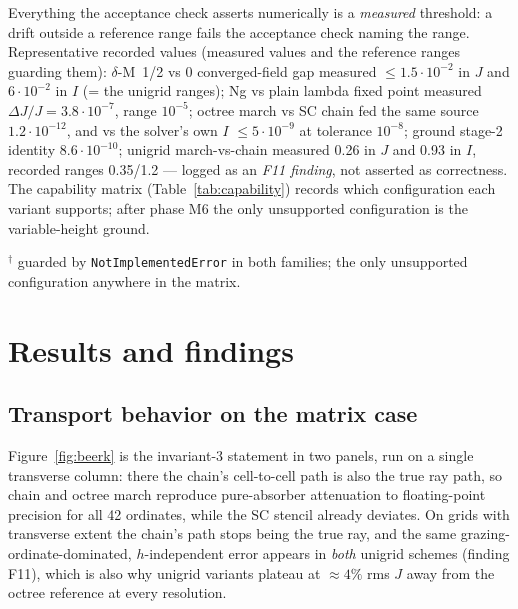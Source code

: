\documentclass[11pt,a4paper]{article}
\begin{document}
Everything the acceptance check asserts numerically is a \emph{measured} threshold: a
drift outside a reference range fails the acceptance check naming the range. Representative
recorded values (measured values and the reference ranges guarding them):
$\delta$-M~1/2 vs 0 converged-field gap measured
$\le1.5\cdot10^{-2}$ in $J$ and $6\cdot10^{-2}$ in $I$ (= the unigrid
ranges); Ng vs plain lambda fixed point measured
$\Delta J/J=3.8\cdot10^{-7}$, range $10^{-5}$; octree march vs SC chain
fed the same source $1.2\cdot10^{-12}$, and vs the solver's own $I$
$\le5\cdot10^{-9}$ at tolerance $10^{-8}$; ground stage-2
identity $8.6\cdot10^{-10}$; unigrid march-vs-chain measured 0.26 in $J$
and 0.93 in $I$, recorded ranges 0.35/1.2 ---
logged as an \emph{F11 finding}, not asserted as correctness. The capability
matrix (Table~\ref{tab:capability}) records which configuration each
variant supports; after phase M6 the only unsupported configuration is the
variable-height ground.

\begin{table}[htbp]
\centering\small
\caption{Capability matrix after phase M6 (finding F1 closed).}
\label{tab:capability}
\resizebox{\textwidth}{!}{}
\medskip
{\footnotesize $^\dagger$ guarded by \texttt{NotImplementedError} in both
families; the only unsupported configuration anywhere in the matrix.}
\end{table}

\section{Results and findings}
\label{sec:results}

\subsection{Transport behavior on the matrix case}

Figure~\ref{fig:beerk} is the invariant-3 statement in two panels, run on
a single transverse column: there the chain's cell-to-cell path is also
the true ray path, so chain and octree march reproduce pure-absorber
attenuation to floating-point precision for all 42 ordinates, while the
SC stencil already deviates. On grids with transverse extent the chain's
path stops being the true ray, and the same grazing-ordinate-dominated,
$h$-independent error appears in \emph{both} unigrid schemes (finding
F11), which is also why unigrid variants plateau at $\approx4\%$ rms $J$
away from the octree reference at every resolution.
\end{document}
